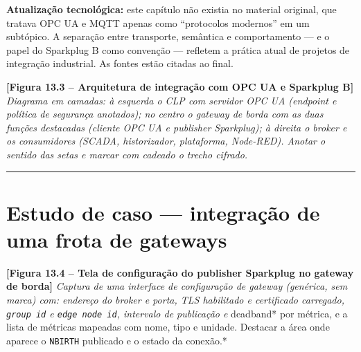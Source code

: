 \begin{caixanota}

\textbf{Atualização tecnológica:} este capítulo não existia no material original, que tratava OPC UA e MQTT apenas como ``protocolos modernos'' em um subtópico. A separação entre transporte, semântica e comportamento --- e o papel do Sparkplug B como convenção --- refletem a prática atual de projetos de integração industrial. As fontes estão citadas ao final.

\end{caixanota}

\begin{caixafigura}

\textbf{{[}Figura 13.3 -- Arquitetura de integração com OPC UA e Sparkplug B{]}}
\emph{Diagrama em camadas: à esquerda o CLP com servidor OPC UA (endpoint e política de segurança anotados); no centro o gateway de borda com as duas funções destacadas (cliente OPC UA e publisher Sparkplug); à direita o broker e os consumidores (SCADA, historizador, plataforma, Node-RED). Anotar o sentido das setas e marcar com cadeado o trecho cifrado.}

\end{caixafigura}

\begin{center}\rule{0.5\linewidth}{0.5pt}\end{center}

\section{\texorpdfstring{Estudo de caso --- integração de uma frota de gateways}{Estudo de caso  integração de uma frota de gateways}}\label{estudo-de-caso-integrauxe7uxe3o-de-uma-frota-de-gateways}

\begin{caixafigura}

\textbf{{[}Figura 13.4 -- Tela de configuração do publisher Sparkplug no gateway de borda{]}}
\emph{Captura de uma interface de configuração de gateway (genérica, sem marca) com: endereço do broker e porta, TLS habilitado e certificado carregado, \passthrough{\lstinline!group id!} e \passthrough{\lstinline!edge node id!}, intervalo de publicação e }deadband* por métrica, e a lista de métricas mapeadas com nome, tipo e unidade. Destacar a área onde aparece o \passthrough{\lstinline!NBIRTH!} publicado e o estado da conexão.*

\end{caixafigura}

